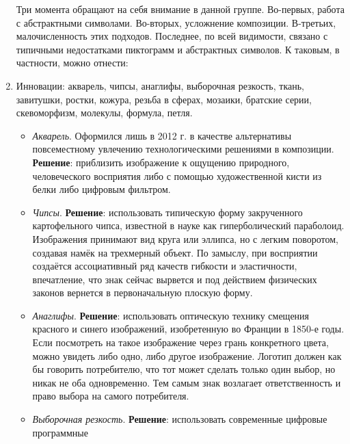 \begin{enumerate}[label=\asbuk*)]
  Три момента обращают на себя внимание в данной группе. Во-первых, работа с абстрактными
  символами. Во-вторых, усложнение композиции. В-третьих, малочисленность этих подходов. Последнее, по
  всей видимости, связано с типичными недостатками пиктограмм и абстрактных символов. К таковым, в
  частности, можно отнести:
\item Инновации: акварель, чипсы, анаглифы, выборочная резкость, ткань, завитушки, ростки, кожура,
  резьба в сферах, мозаики, братские серии, скевоморфизм, молекулы, формула, петля.
  \begin{itemize}
  \item \emph{Акварель}. Оформился лишь в 2012 г. в качестве альтернативы повсеместному увлечению
    технологическими решениями в композиции. \textbf{Решение}:  приблизить изображение к ощущению
    природного, человеческого восприятия либо с помощью художественной кисти из белки либо цифровым
    фильтром.
  \item \emph{Чипсы}. \textbf{Решение}: использовать типическую форму закрученного картофельного
    чипса, известной в науке как гиперболический параболоид. Изображения принимают вид круга или
    эллипса, но с легким поворотом, создавая намёк на трехмерный объект. По замыслу, при восприятии
    создаётся ассоциативный ряд качеств гибкости и эластичности, впечатление, что знак сейчас
    вырвется и под действием физических законов вернется в первоначальную плоскую форму.
  \item \emph{Анаглифы}. \textbf{Решение}: использовать оптическую технику смещения красного и
    синего изображений, изобретенную во Франции в 1850-е годы. Если посмотреть на такое изображение
    через грань конкретного цвета, можно увидеть либо одно, либо другое изображение. Логотип должен
    как бы говорить потребителю, что тот может сделать только один выбор, но никак не оба
    одновременно. Тем самым знак возлагает ответственность и право выбора на самого потребителя.
  \item \emph{Выборочная резкость}. \textbf{Решение}: использовать современные цифровые программные

\end{itemize}
\end{enumerate}
